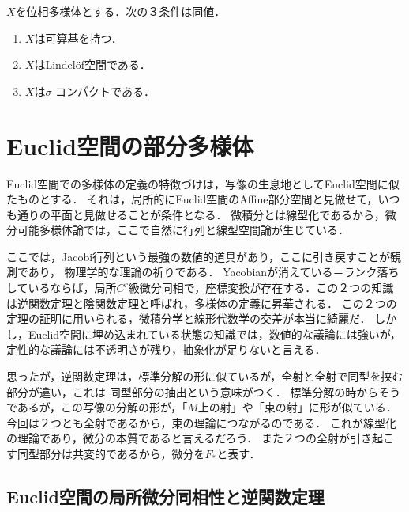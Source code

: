 \documentclass[uplatex,dvipdfmx]{jsreport}
\begin{document}
\begin{lemma}
    $X$を位相多様体とする．次の３条件は同値．
    \begin{enumerate}
        \item $X$は可算基を持つ．
        \item $X$はLindelöf空間である．
        \item $X$は$\sigma$-コンパクトである．
    \end{enumerate}
\end{lemma}

\section{Euclid空間の部分多様体}

\begin{tcolorbox}[colframe=ForestGreen, colback=ForestGreen!10!white,breakable,colbacktitle=ForestGreen!40!white,coltitle=black,fonttitle=\bfseries\sffamily,
title=Euclid空間の部分多様体とは，局所的にEuclid空間のAffine部分空間に微分同相な空間である．ここから入れ物からの離脱を試みる．]
    Euclid空間での多様体の定義の特徴づけは，写像の生息地としてEuclid空間に似たものとする．
    それは，局所的にEuclid空間のAffine部分空間と見做せて，いつも通りの平面と見做せることが条件となる．
    微積分とは線型化であるから，微分可能多様体論では，ここで自然に行列と線型空間論が生じている．

    ここでは，Jacobi行列という最強の数値的道具があり，ここに引き戻すことが観測であり，
    物理学的な理論の祈りである．
    Yacobianが消えている＝ランク落ちしているならば，局所$C^r$級微分同相で，座標変換が存在する．この２つの知識は逆関数定理と陰関数定理と呼ばれ，多様体の定義に昇華される．
    この２つの定理の証明に用いられる，微積分学と線形代数学の交差が本当に綺麗だ．
    しかし，Euclid空間に埋め込まれている状態の知識では，数値的な議論には強いが，定性的な議論には不透明さが残り，抽象化が足りないと言える．

    思ったが，逆関数定理は，標準分解の形に似ているが，全射と全射で同型を挟む部分が違い，これは
    同型部分の抽出という意味がつく．
    標準分解の時からそうであるが，この写像の分解の形が，「$M$上の射」や「束の射」に形が似ている．
    今回は２つとも全射であるから，束の理論につながるのである．
    これが線型化の理論であり，微分の本質であると言えるだろう．
    また２つの全射が引き起こす同型部分は共変的であるから，微分を$F_*$と表す．
\end{tcolorbox}

\subsection{Euclid空間の局所微分同相性と逆関数定理}
\end{document}
